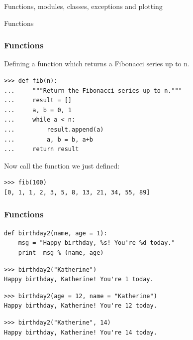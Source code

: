 \begin{frame}
\begin{center}
\Huge{Functions, modules, classes, exceptions and plotting}
\end{center}
\end{frame}

\begin{frame}
    \begin{center}
    \Huge{Functions}
    \end{center}
\end{frame}

\begin{frame}[fragile]
    \frametitle{Functions}
Defining a function which returns a Fibonacci series up to n.
    \begin{myColorBox}{0.9}{}
\begin{verbatim}
>>> def fib(n):
...     """Return the Fibonacci series up to n."""
...     result = []
...     a, b = 0, 1
...     while a < n:
...         result.append(a)
...         a, b = b, a+b
...     return result
\end{verbatim}
    \end{myColorBox}
\pause
Now call the function we just defined:
    \begin{myColorBox}{0.9}{}
\begin{verbatim}
>>> fib(100)
[0, 1, 1, 2, 3, 5, 8, 13, 21, 34, 55, 89]
\end{verbatim}
    \end{myColorBox}
\end{frame}

\begin{frame}[fragile]
    \frametitle{Functions}
    \begin{myColorBox}{0.9}{}
\begin{verbatim}
def birthday2(name, age = 1):
    msg = "Happy birthday, %s! You're %d today."
    print  msg % (name, age)
\end{verbatim}
    \end{myColorBox}
\pause
    \begin{myColorBox}{0.9}{}
\begin{verbatim}
>>> birthday2("Katherine")
Happy birthday, Katherine! You're 1 today.
\end{verbatim}
    \end{myColorBox}
\pause
    \begin{myColorBox}{0.9}{}
\begin{verbatim}
>>> birthday2(age = 12, name = "Katherine")
Happy birthday, Katherine! You're 12 today.
\end{verbatim}
    \end{myColorBox}
\pause
    \begin{myColorBox}{0.9}{}
\begin{verbatim}
>>> birthday2("Katherine", 14)
Happy birthday, Katherine! You're 14 today.
\end{verbatim}
    \end{myColorBox}
\end{frame}

